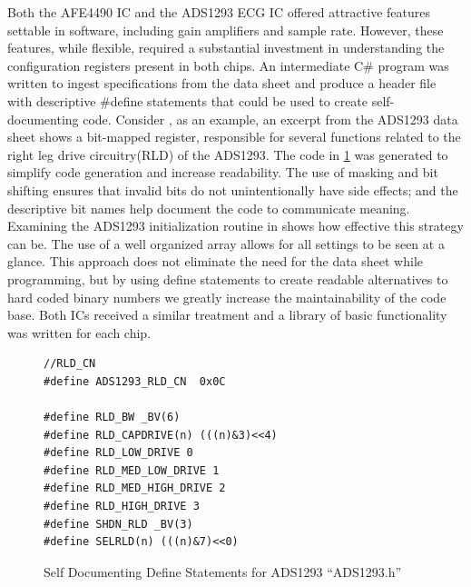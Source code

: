 Both the AFE4490  IC and the ADS1293 ECG IC offered attractive features settable in software, including gain amplifiers and sample rate. However, these features, while flexible, required a substantial investment in understanding the configuration registers present in both chips. An intermediate C\# program was written to ingest specifications from the data sheet and produce a header file with descriptive \#define statements that could be used to create self-documenting code. Consider , as an example, an excerpt from the ADS1293 data sheet shows a  bit-mapped register, responsible for several functions related to the right leg drive circuitry(RLD) of the ADS1293. The code in \cref{fig:ADS1293_Defines} was generated to simplify code generation and increase readability. The use of masking and bit shifting ensures that invalid bits do not unintentionally have side effects; and the descriptive bit names help document the code to communicate meaning. Examining the ADS1293 initialization routine in  shows how effective this strategy can be. The use of a well organized array allows for all settings to be seen at a glance. This approach does not eliminate the need for the data sheet while programming, but by using define statements to create readable alternatives to hard coded binary numbers we greatly increase the maintainability of the code base. Both ICs received a similar treatment and a library of basic functionality was written for each chip.

\begin{figure}
	\begin{center}
\begin{lstlisting}[frame=single]
//RLD_CN
#define ADS1293_RLD_CN  0x0C

#define RLD_BW _BV(6)
#define RLD_CAPDRIVE(n) (((n)&3)<<4)
#define RLD_LOW_DRIVE 0
#define RLD_MED_LOW_DRIVE 1
#define RLD_MED_HIGH_DRIVE 2
#define RLD_HIGH_DRIVE 3
#define SHDN_RLD _BV(3)
#define SELRLD(n) (((n)&7)<<0)
\end{lstlisting}
		\caption{Self Documenting Define Statements for ADS1293 ``ADS1293.h''}
		\label{fig:ADS1293_Defines}
	\end{center}
\end{figure}



